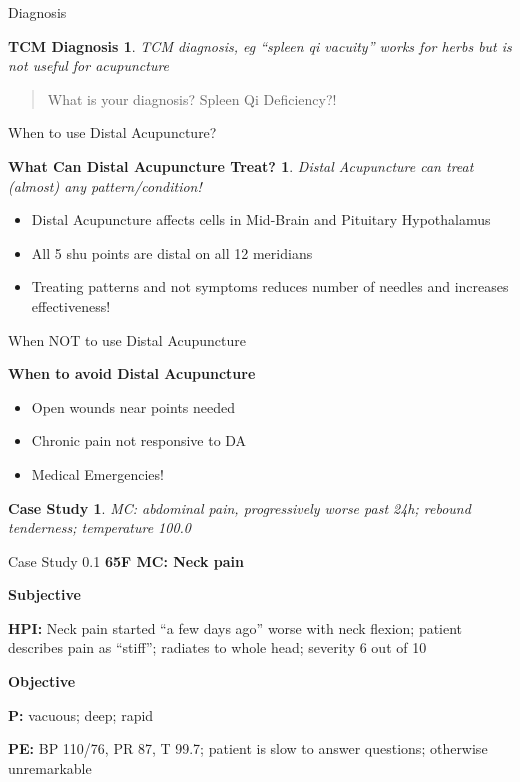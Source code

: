 \begin{frame}{Diagnosis} %
  \newtheorem{t1.4}{TCM Diagnosis}
  \begin{t1.4}
    TCM diagnosis, eg ``spleen qi vacuity'' works for herbs but is not useful for acupuncture
  \end{t1.4}

  \begin{quote}
    What is your diagnosis? Spleen Qi Deficiency?!
  \end{quote}

\end{frame}

\begin{frame}{When to use Distal Acupuncture?} %
  \newtheorem{t1.5}{What Can Distal Acupuncture Treat?}
  \begin{t1.5}
    Distal Acupuncture can treat (almost) any pattern/condition!
  \end{t1.5}

  \begin{itemize}
  \item Distal Acupuncture affects cells in Mid-Brain and Pituitary Hypothalamus
  \item All 5 shu points are distal on all 12 meridians
  \item Treating patterns and not symptoms reduces number of needles and increases effectiveness!
  \end{itemize}

\end{frame}

\begin{frame}{When NOT to use Distal Acupuncture} %
  
  \textbf{\Large When to avoid Distal Acupuncture}
  \begin{itemize} \itemsep1.5em
  \item Open wounds near points needed
  \item Chronic pain not responsive to DA
  \item Medical Emergencies!
  \end{itemize}

  \newtheorem{t1.6}{Case Study}
  \begin{t1.6}
    MC: abdominal pain, progressively worse past 24h; rebound tenderness; temperature 100.0
  \end{t1.6}
  
\end{frame}

\begin{frame}{Case Study 0.1} %
  \textbf{\Large 65F MC: Neck pain}
  
  \textbf{\large Subjective}
  
  \textbf{HPI:} Neck pain started ``a few days ago'' worse with neck flexion; patient describes pain as ``stiff''; radiates to whole head; severity 6 out of 10

  \textbf{\large Objective}
  
  \textbf{P:} vacuous; deep; rapid

  \textbf{PE:} BP 110/76, PR 87, T 99.7; patient is slow to answer questions; otherwise unremarkable

\end{frame}

